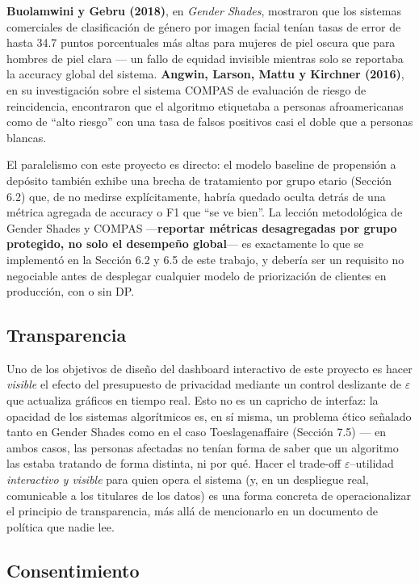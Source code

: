 \documentclass[11pt,a4paper]{article}
\newcommand{\eps}{\ensuremath{\varepsilon}}
\begin{document}
\textbf{Buolamwini y Gebru (2018)}, en \emph{Gender Shades}, mostraron que los sistemas
comerciales de clasificación de género por imagen facial tenían tasas de error de hasta 34.7
puntos porcentuales más altas para mujeres de piel oscura que para hombres de piel clara --- un
fallo de equidad invisible mientras solo se reportaba la accuracy global del sistema.
\textbf{Angwin, Larson, Mattu y Kirchner (2016)}, en su investigación sobre el sistema COMPAS de
evaluación de riesgo de reincidencia, encontraron que el algoritmo etiquetaba a personas
afroamericanas como de ``alto riesgo'' con una tasa de falsos positivos casi el doble que a
personas blancas.

El paralelismo con este proyecto es directo: el modelo baseline de propensión a depósito también
exhibe una brecha de tratamiento por grupo etario (Sección 6.2) que, de no medirse
explícitamente, habría quedado oculta detrás de una métrica agregada de accuracy o F1 que ``se ve
bien''. La lección metodológica de Gender Shades y COMPAS ---\textbf{reportar métricas
desagregadas por grupo protegido, no solo el desempeño global}--- es exactamente lo que se
implementó en la Sección 6.2 y 6.5 de este trabajo, y debería ser un requisito no negociable antes
de desplegar cualquier modelo de priorización de clientes en producción, con o sin DP.

\subsection{Transparencia}

Uno de los objetivos de diseño del dashboard interactivo de este proyecto es hacer \emph{visible}
el efecto del presupuesto de privacidad mediante un control deslizante de \eps{} que actualiza
gráficos en tiempo real. Esto no es un capricho de interfaz: la opacidad de los sistemas
algorítmicos es, en sí misma, un problema ético señalado tanto en Gender Shades como en el caso
Toeslagenaffaire (Sección 7.5) --- en ambos casos, las personas afectadas no tenían forma de saber
que un algoritmo las estaba tratando de forma distinta, ni por qué. Hacer el trade-off
\eps--utilidad \emph{interactivo y visible} para quien opera el sistema (y, en un despliegue real,
comunicable a los titulares de los datos) es una forma concreta de operacionalizar el principio de
transparencia, más allá de mencionarlo en un documento de política que nadie lee.

\subsection{Consentimiento}
\end{document}
